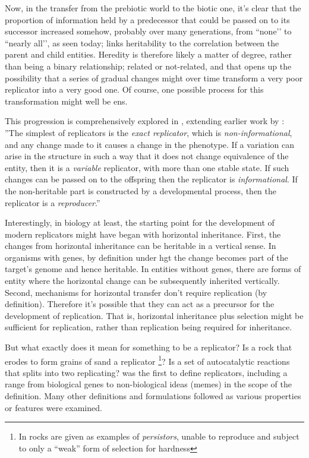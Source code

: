 Now, in the transfer from the prebiotic world to the biotic one, it’s clear that the proportion of information held by a predecessor that could be passed on to its successor increased somehow, probably over many generations, from ``none’’ to ``nearly all’’, as seen today; \cite{Vasas2012a} links heritability to the correlation between the parent and child entities. Heredity is therefore likely a matter of degree, rather than being a binary relationship; related or not-related, and that opens up the possibility that a series of gradual changes might over time transform a very poor replicator into a very good one. Of course, one possible process for this transformation might well be \gls{ens}.

This progression is comprehensively explored in \cite{Zachar2010}, extending earlier work by \cite{Szathmary1999,Szathmary:2006ty}: ''The simplest of replicators is the \emph{exact replicator}, which is \emph{non-informational}, and any change made to it causes a change in the phenotype. If a variation can arise in the structure in such a way that it does not change equivalence of the entity, then it is a \emph{variable} replicator, with more than one stable state. If such changes can be passed on to the offspring then the replicator is \emph{informational}. If the non-heritable part is constructed by a developmental process, then the replicator is a \emph{reproducer}.'' \parencite[p.21]{Zachar2010}

Interestingly, in biology at least, the starting point for the development of modern replicators might have began with horizontal inheritance. First, the changes from horizontal inheritance can be heritable in a vertical sense. In organisms with genes, by definition under \gls{hgt} the change becomes part of the target’s genome and hence heritable. In entities without genes, there are forms of entity where the horizontal change can be subsequently inherited vertically. Second, mechanisms for horizontal transfer don’t require replication (by definition). Therefore it’s possible that they can act as a precursor for the development of replication. That is, horizontal inheritance plus selection might be sufficient for replication, rather than replication being required for inheritance.

But what exactly does it mean for something to be a replicator? Is a rock that erodes to form grains of sand a replicator \footnote{In \cite{Bourrat2015} rocks are given as examples of \emph{persistors}, unable to reproduce and subject to only a ``weak'' form of selection for hardness}? Is a set of autocatalytic reactions that splits into two replicating? \Cite{Dawkins1976} was the first to define replicators, including a range from biological genes to non-biological ideas (memes) in the scope of the definition. Many other definitions and formulations followed as various properties or features were examined. 

